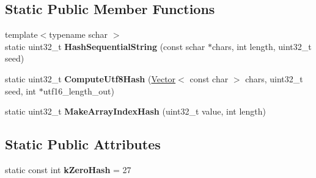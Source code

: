 \subsection*{Static Public Member Functions}
\begin{DoxyCompactItemize}
\item 
\hypertarget{classv8_1_1internal_1_1_string_hasher_af383d0048c55829db62e36cdcbeaaf2d}{}{\footnotesize template$<$typename schar $>$ }\\static uint32\+\_\+t {\bfseries Hash\+Sequential\+String} (const schar $\ast$chars, int length, uint32\+\_\+t seed)\label{classv8_1_1internal_1_1_string_hasher_af383d0048c55829db62e36cdcbeaaf2d}

\item 
\hypertarget{classv8_1_1internal_1_1_string_hasher_a7a7b5ead06159017190235d8b18c834c}{}static uint32\+\_\+t {\bfseries Compute\+Utf8\+Hash} (\hyperlink{classv8_1_1internal_1_1_vector}{Vector}$<$ const char $>$ chars, uint32\+\_\+t seed, int $\ast$utf16\+\_\+length\+\_\+out)\label{classv8_1_1internal_1_1_string_hasher_a7a7b5ead06159017190235d8b18c834c}

\item 
\hypertarget{classv8_1_1internal_1_1_string_hasher_aa478bc40298c8bd5f5478b40fa444c10}{}static uint32\+\_\+t {\bfseries Make\+Array\+Index\+Hash} (uint32\+\_\+t value, int length)\label{classv8_1_1internal_1_1_string_hasher_aa478bc40298c8bd5f5478b40fa444c10}

\end{DoxyCompactItemize}
\subsection*{Static Public Attributes}
\begin{DoxyCompactItemize}
\item 
\hypertarget{classv8_1_1internal_1_1_string_hasher_ae0e5f2b5dc2ba3f181591f7b63f9149b}{}static const int {\bfseries k\+Zero\+Hash} = 27\label{classv8_1_1internal_1_1_string_hasher_ae0e5f2b5dc2ba3f181591f7b63f9149b}

\end{DoxyCompactItemize}
